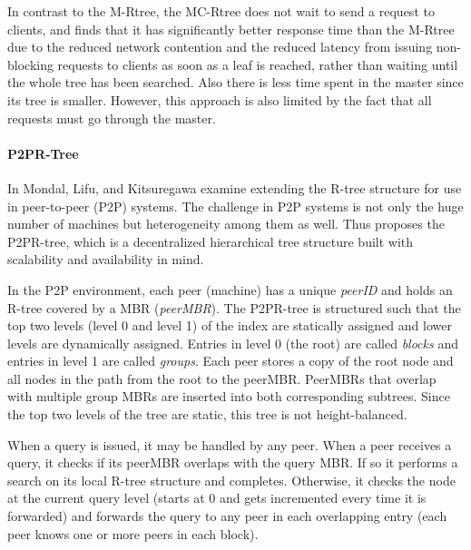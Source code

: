 In contrast to the M-Rtree, the MC-Rtree does not wait to send a request to
clients, and \cite{schnitzer1999master} finds that it has significantly better 
response time than the M-Rtree due to the reduced network contention and the 
reduced latency from issuing non-blocking requests to clients as soon as a leaf 
is reached, rather than waiting until the whole tree has been searched. Also 
there is less time spent in the master since its tree is smaller. However, this 
approach is also limited by the fact that all requests must go through the master.



\paragraph{P2PR-Tree}
In \cite{mondal2005p2pr} Mondal, Lifu, and Kitsuregawa examine extending the 
R-tree structure for use in peer-to-peer (P2P) systems. The challenge in P2P 
systems is not only the huge number of machines but heterogeneity among them as 
well. Thus \cite{mondal2005p2pr} proposes the P2PR-tree, which is a 
decentralized hierarchical tree structure built with scalability and availability
in mind. 

In the P2P environment, each peer (machine) has a unique \emph{peerID} and holds
an R-tree covered by a MBR (\emph{peerMBR}). The P2PR-tree is structured
such that the top two levels (level 0 and level 1) of the index are statically 
assigned and lower levels are dynamically assigned. Entries in level 0 (the root)
are called \emph{blocks} and entries in level 1 are called \emph{groups}. Each 
peer stores a copy of the root node and all nodes in the path from the root to 
the peerMBR. PeerMBRs that overlap with multiple group MBRs are inserted into 
both corresponding subtrees. Since the top two levels of the tree are static, 
this tree is not height-balanced\cite{mondal2005p2pr}.

When a query is issued, it may be handled by any peer. When a peer receives a 
query, it checks if its peerMBR overlaps with the query MBR. If so it performs 
a search on its local R-tree structure and completes. Otherwise, it checks the 
node at the current query level (starts at 0 and gets incremented every time it
is forwarded) and forwards the query to any peer in each overlapping entry (each
peer knows one or more peers in each block).

